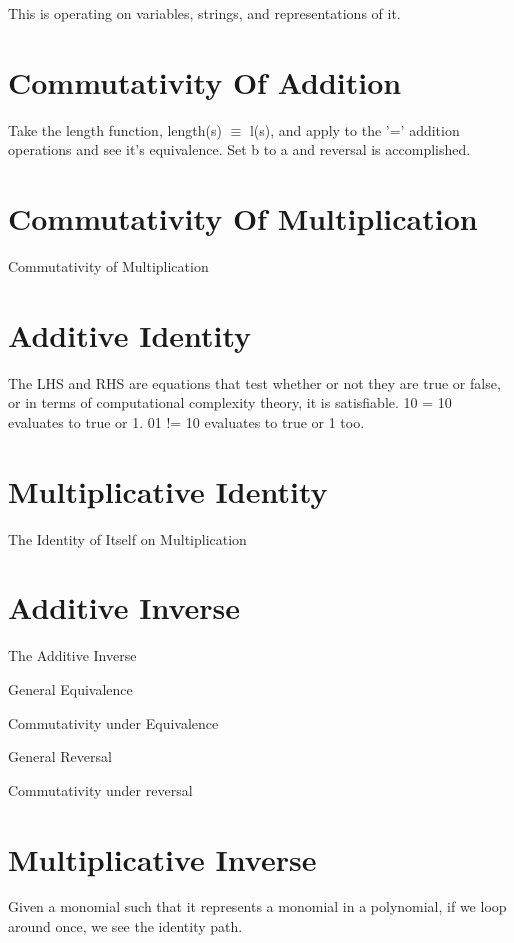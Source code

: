 This is operating on variables, strings, and representations of it.

\section{Commutativity Of Addition}

Take the length function, length(s) $\equiv$ l(s), and apply to the '=' addition operations and see it's equivalence. Set b to a and reversal is accomplished.

\section{Commutativity Of Multiplication}

Commutativity of Multiplication

\section{Additive Identity}

The LHS and RHS are equations that test whether or not they are true or false, or in terms of computational complexity theory, it is satisfiable.
10 = 10 evaluates to true or 1.
01 != 10 evaluates to true or 1 too.

\section{Multiplicative Identity}

The Identity of Itself on Multiplication

\section{Additive Inverse}

The Additive Inverse

General Equivalence

Commutativity under Equivalence

General Reversal

Commutativity under reversal

\section{Multiplicative Inverse}

Given a monomial such that it represents a monomial in a polynomial, if we loop around once, we see the identity path.

